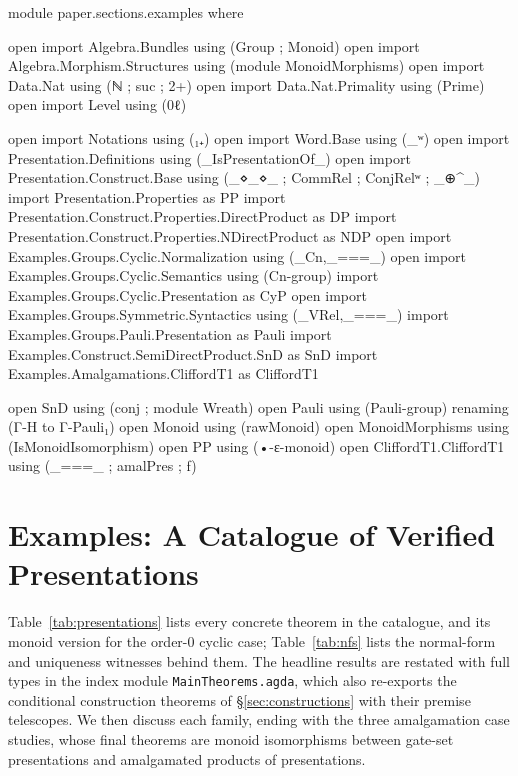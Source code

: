 \begin{code}[hide]
module paper.sections.examples where

open import Algebra.Bundles using (Group ; Monoid)
open import Algebra.Morphism.Structures using (module MonoidMorphisms)
open import Data.Nat using (ℕ ; suc ; 2+)
open import Data.Nat.Primality using (Prime)
open import Level using (0ℓ)

open import Notations using (₁₊)
open import Word.Base using (_ʷ)
open import Presentation.Definitions using (_IsPresentationOf_)
open import Presentation.Construct.Base using (_⋄_⋄_ ; CommRel ; ConjRelʷ ; _⊕^_)
import Presentation.Properties as PP
import Presentation.Construct.Properties.DirectProduct as DP
import Presentation.Construct.Properties.NDirectProduct as NDP
open import Examples.Groups.Cyclic.Normalization using (_Cn,_===_)
open import Examples.Groups.Cyclic.Semantics using (Cn-group)
import Examples.Groups.Cyclic.Presentation as CyP
open import Examples.Groups.Symmetric.Syntactics using (_VRel,_===_)
import Examples.Groups.Pauli.Presentation as Pauli
import Examples.Construct.SemiDirectProduct.SnD as SnD
import Examples.Amalgamations.CliffordT1 as CliffordT1

open SnD using (conj ; module Wreath)
open Pauli using (Pauli-group) renaming (Γ-H to Γ-Pauli₁)
open Monoid using (rawMonoid)
open MonoidMorphisms using (IsMonoidIsomorphism)
open PP using (•-ε-monoid)
open CliffordT1.CliffordT1 using (_===_ ; amalPres ; f)
\end{code}
\section{Examples: A Catalogue of Verified Presentations}\label{sec:examples}

Table~\ref{tab:presentations} lists
every concrete  theorem in the catalogue,
and its monoid version for the order-$0$ cyclic case;
Table~\ref{tab:nfs} lists the normal-form and uniqueness witnesses behind
them.  The headline results are restated with full types in the index module
\texttt{MainTheorems.agda}, which also re-exports the conditional
construction theorems of \S\ref{sec:constructions} with their premise
telescopes.  We then discuss each family, ending with the three
amalgamation case studies, whose final theorems are monoid
isomorphisms between gate-set presentations and amalgamated
products of presentations.

